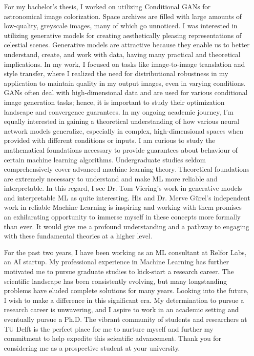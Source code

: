 \documentclass{article}
\begin{document}
\vspace{5pt}
\hspace{0.25in}For my bachelor’s thesis, I worked on utilizing Conditional GANs
for astronomical image colorization. Space archives are filled with large
amounts of low-quality, greyscale images, many of which go unnoticed. I was
interested in utilizing generative models for creating aesthetically pleasing
representations of celestial scenes. Generative models are attractive because
they enable us to better understand, create, and work with data, having many
practical and theoretical implications. In my work, I focused on tasks like
image-to-image translation and style transfer, where I realized the need for
distributional robustness in my application to maintain quality in my output
images, even in varying conditions. GANs often deal with high-dimensional data
and are used for various conditional image generation tasks; hence, it is
important to study their optimization landscape and convergence guarantees. In
my ongoing academic journey, I’m equally interested in gaining a theoretical
understanding of how various neural network models generalize, especially in
complex, high-dimensional spaces when provided with different conditions or
inputs. I am curious to study the mathematical foundations necessary to provide
guarantees about behaviour of certain machine learning algorithms. Undergraduate
studies seldom comprehensively cover advanced machine learning theory.
Theoretical foundations are extremely necessary to understand and make ML more
reliable and interpretable. In this regard, I see Dr. Tom Viering's work in
generative models and interpretable ML as quite interesting. His and Dr. Merve
Gürel’s independent work in reliable Machine Learning is inspiring and working
with them promises an exhilarating opportunity to immerse myself in these
concepts more formally than ever. It would give me a profound understanding and
a pathway to engaging with these fundamental theories at a higher level.

\vspace{5pt}
\hspace{0.25in}For the past two years, I have been working as an ML consultant
at Relfor Labs, an AI startup. My professional experience in Machine Learning
has further motivated me to pursue graduate studies to kick-start a research
career. The scientific landscape has been consistently evolving, but many
longstanding problems have eluded complete solutions for many years. Looking
into the future, I wish to make a difference in this significant era. My
determination to pursue a research career is unwavering, and I aspire to work in
an academic setting and eventually pursue a Ph.D. The vibrant community of
students and researchers at TU Delft is the perfect place for me to nurture
myself and further my commitment to help expedite this scientific advancement.
Thank you for considering me as a prospective student at your university.
\end{document}
